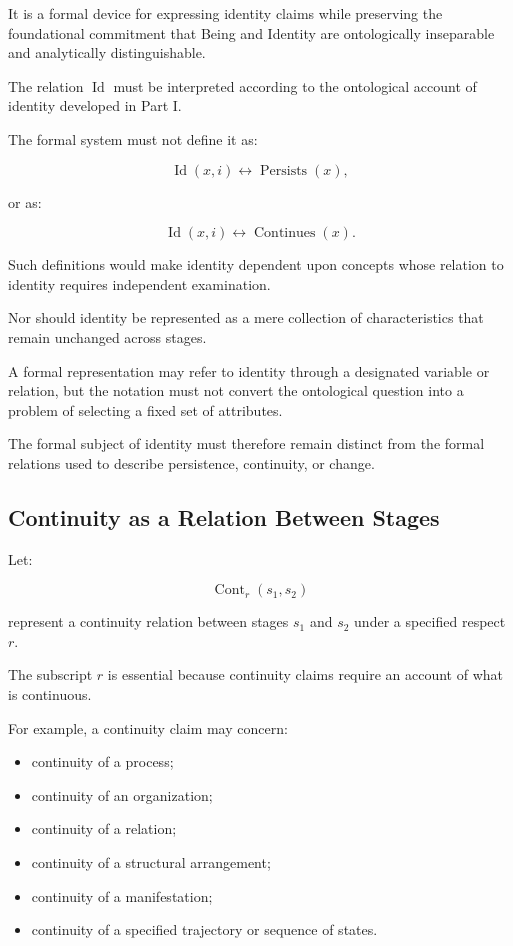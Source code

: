 It is a formal device for expressing identity
claims while preserving the foundational
commitment that Being and Identity are
ontologically inseparable and analytically
distinguishable.

The relation \(\operatorname{Id}\) must be
interpreted according to the ontological
account of identity developed in Part I.

The formal system must not define it as:

\[
    \operatorname{Id}(x,i)
    \leftrightarrow
    \operatorname{Persists}(x),
\]

or as:

\[
    \operatorname{Id}(x,i)
    \leftrightarrow
    \operatorname{Continues}(x).
\]

Such definitions would make identity dependent
upon concepts whose relation to identity requires
independent examination.

Nor should identity be represented as a mere
collection of characteristics that remain
unchanged across stages.

A formal representation may refer to identity
through a designated variable or relation,
but the notation must not convert the ontological
question into a problem of selecting a fixed
set of attributes.

The formal subject of identity must therefore
remain distinct from the formal relations
used to describe persistence, continuity,
or change.

\subsection{Continuity as a Relation Between Stages}

Let:

\[
    \operatorname{Cont}_{r}(s_1,s_2)
\]

represent a continuity relation between
stages \(s_1\) and \(s_2\) under a specified
respect \(r\).

The subscript \(r\) is essential because
continuity claims require an account of
what is continuous.

For example, a continuity claim may concern:

\begin{itemize}
    \item continuity of a process;
    \item continuity of an organization;
    \item continuity of a relation;
    \item continuity of a structural arrangement;
    \item continuity of a manifestation;
    \item continuity of a specified trajectory
    or sequence of states.
\end{itemize}

